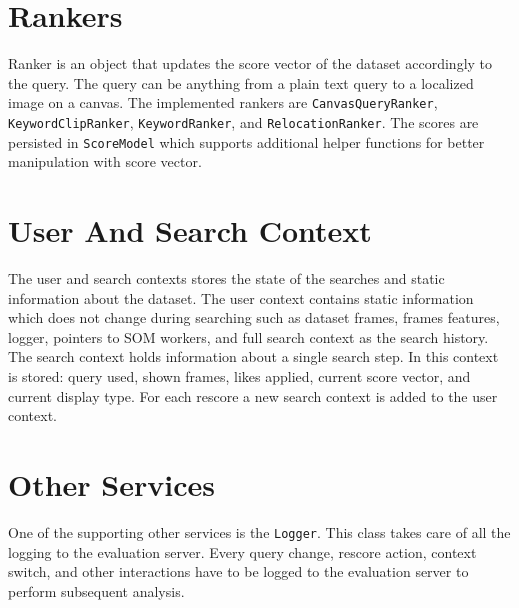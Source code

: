 \section{Rankers}

Ranker is an object that updates the score vector of the dataset accordingly to the query. The query can be anything from a plain text query to a localized image on a canvas. The implemented rankers are \lstinline{CanvasQueryRanker}, \lstinline{KeywordClipRanker}, \lstinline{KeywordRanker}, and \lstinline{RelocationRanker}. The scores are persisted in \lstinline{ScoreModel} which supports additional helper functions for better manipulation with score vector.

\section{User And Search Context}

The user and search contexts stores the state of the searches and static information about the dataset. The user context contains static information which does not change during searching such as dataset frames, frames features, logger, pointers to SOM workers, and full search context as the search history. The search context holds information about a single search step. In this context is stored: query used, shown frames, likes applied, current score vector, and current display type. For each rescore a new search context is added to the user context.

\section{Other Services}

One of the supporting other services is the \lstinline{Logger}. This class takes care of all the logging to the evaluation server. Every query change, rescore action, context switch, and other interactions have to be logged to the evaluation server to perform subsequent analysis. 